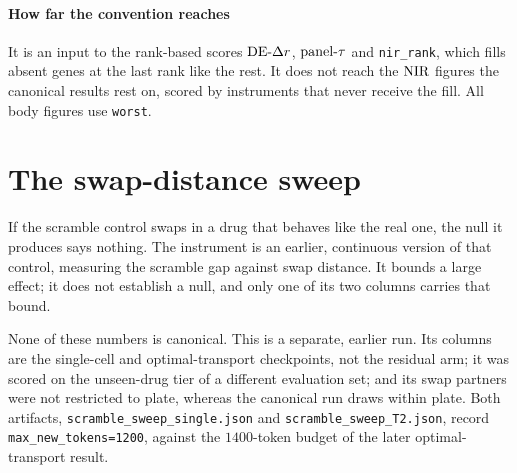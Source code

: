 \paragraph{How far the convention reaches} It is an input to the rank-based
scores $\textrm{DE-}\Delta r$, $\textrm{panel-}\tau$ and \texttt{nir\_rank}, which fills absent genes at
the last rank like the rest. It does not reach the $\textrm{NIR}$
figures the canonical results rest on, scored by instruments that never receive
the fill. All body figures use \texttt{worst}.

\section{The swap-distance sweep}
\label{sec:app-sweep}

\begin{question}
If the scramble control swaps in a drug that behaves like the real one, the null
it produces says nothing. The instrument is an earlier, continuous version of
that control, measuring the scramble gap against swap distance. It bounds a
large effect; it does not establish a null, and only one of its two columns
carries that bound.
\end{question}

\noindent
None of these numbers is canonical. This is a
separate, earlier run. Its columns are the single-cell and
optimal-transport checkpoints, not the residual arm; it was scored on the
unseen-drug tier of a different evaluation set; and its swap partners were not
restricted to plate, whereas the canonical run draws within plate. Both
artifacts, \texttt{scramble\_sweep\_single.json} and
\texttt{scramble\_sweep\_T2.json}, record \texttt{max\_new\_tokens=1200},
against the $1400$-token budget of the later optimal-transport result.

